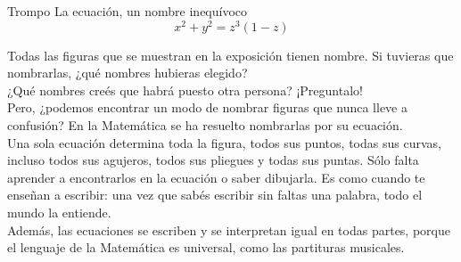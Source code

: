 \begin{surferPage}{Trompo}
La ecuaci\'on, un nombre inequ\'ivoco\\
\smallskip
\[x^2 + y^2	= z^3	(1 - z) \]

\vspace{0.3cm}
Todas las figuras que se muestran en la exposici\'on tienen nombre. Si tuvieras que nombrarlas, ¿qu\'e nombres hubieras elegido?\\
\vspace{0.3cm}
¿Qu\'e nombres cre\'es que habr\'a puesto otra persona? ¡Preguntalo!\\
\vspace{0.3cm}
Pero, ¿podemos encontrar un modo de nombrar figuras que nunca lleve a confusi\'on? En la Matem\'atica se ha resuelto nombrarlas por su ecuaci\'on.\\
\vspace{0.3cm}
Una sola ecuaci\'on determina toda la figura, todos sus puntos, todas sus curvas, incluso todos sus agujeros, todos sus pliegues y todas sus puntas. S\'olo falta aprender a encontrarlos en la ecuaci\'on o saber dibujarla. Es como cuando te enseñan a escribir: una vez que sab\'es escribir sin faltas una palabra, todo el mundo la entiende.\\
\vspace{0.3cm}
Adem\'as, las ecuaciones se escriben y se interpretan igual en todas partes, porque el lenguaje de la Matem\'atica es universal, como las partituras musicales.
\end{surferPage}
